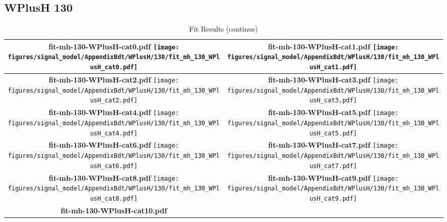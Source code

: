 \subsection{WPlusH 130}
\begin{longtable}{|c|c|}
\caption{Fit Results}
\endfirsthead
\caption{Fit Results (continue)}
\endhead
\hline
\parbox{0.47\textwidth}{
\centering
{\bfseries fit-mh-130-WPlusH-cat0.pdf}
\texttt{[image: figures/signal\_model/AppendixBdt/WPlusH/130/fit\_mh\_130\_WPlusH\_cat0.pdf]}
}
 & \parbox{0.47\textwidth}{
\centering
{\bfseries fit-mh-130-WPlusH-cat1.pdf}
\texttt{[image: figures/signal\_model/AppendixBdt/WPlusH/130/fit\_mh\_130\_WPlusH\_cat1.pdf]}
}
 \\
\hline
\parbox{0.47\textwidth}{
\centering
{\bfseries fit-mh-130-WPlusH-cat2.pdf}
\texttt{[image: figures/signal\_model/AppendixBdt/WPlusH/130/fit\_mh\_130\_WPlusH\_cat2.pdf]}
}
 & \parbox{0.47\textwidth}{
\centering
{\bfseries fit-mh-130-WPlusH-cat3.pdf}
\texttt{[image: figures/signal\_model/AppendixBdt/WPlusH/130/fit\_mh\_130\_WPlusH\_cat3.pdf]}
}
 \\
\hline
\parbox{0.47\textwidth}{
\centering
{\bfseries fit-mh-130-WPlusH-cat4.pdf}
\texttt{[image: figures/signal\_model/AppendixBdt/WPlusH/130/fit\_mh\_130\_WPlusH\_cat4.pdf]}
}
 & \parbox{0.47\textwidth}{
\centering
{\bfseries fit-mh-130-WPlusH-cat5.pdf}
\texttt{[image: figures/signal\_model/AppendixBdt/WPlusH/130/fit\_mh\_130\_WPlusH\_cat5.pdf]}
}
 \\
\hline
\parbox{0.47\textwidth}{
\centering
{\bfseries fit-mh-130-WPlusH-cat6.pdf}
\texttt{[image: figures/signal\_model/AppendixBdt/WPlusH/130/fit\_mh\_130\_WPlusH\_cat6.pdf]}
}
 & \parbox{0.47\textwidth}{
\centering
{\bfseries fit-mh-130-WPlusH-cat7.pdf}
\texttt{[image: figures/signal\_model/AppendixBdt/WPlusH/130/fit\_mh\_130\_WPlusH\_cat7.pdf]}
}
 \\
\hline
\parbox{0.47\textwidth}{
\centering
{\bfseries fit-mh-130-WPlusH-cat8.pdf}
\texttt{[image: figures/signal\_model/AppendixBdt/WPlusH/130/fit\_mh\_130\_WPlusH\_cat8.pdf]}
}
 & \parbox{0.47\textwidth}{
\centering
{\bfseries fit-mh-130-WPlusH-cat9.pdf}
\texttt{[image: figures/signal\_model/AppendixBdt/WPlusH/130/fit\_mh\_130\_WPlusH\_cat9.pdf]}
}
 \\
\hline
\parbox{0.47\textwidth}{
\centering
{\bfseries fit-mh-130-WPlusH-cat10.pdf}
}
\end{longtable}
